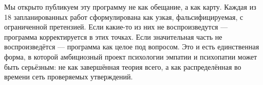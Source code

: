Мы открыто публикуем эту программу не как обещание, а как карту. Каждая из 18 запланированных работ сформулирована как узкая, фальсифицируемая, с ограниченной претензией. Если какие-то из них не воспроизведутся --- программа корректируется в этих точках. Если значительная часть не воспроизведётся --- программа как целое под вопросом. Это и есть единственная форма, в которой амбициозный проект психологии эмпатии и психопатии может быть серьёзным: не как завершённая теория всего, а как распределённая во времени сеть проверяемых утверждений.
